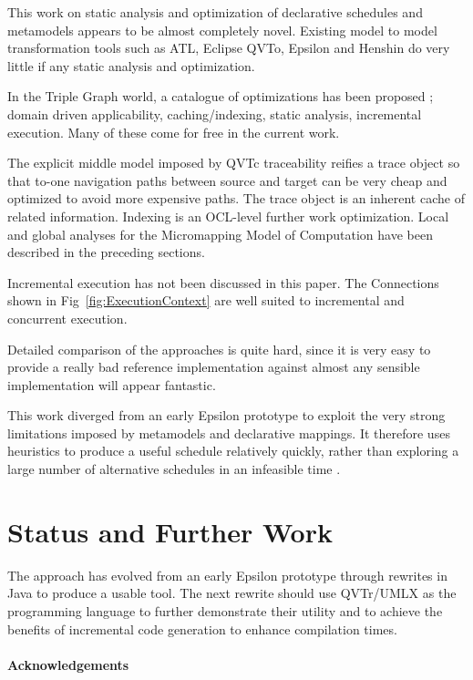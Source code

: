 \documentclass{llncs}
\begin{document}
This work on static analysis and optimization of declarative schedules and metamodels appears to be almost completely novel. Existing model to model transformation tools such as ATL, Eclipse QVTo, Epsilon and Henshin \cite{Eclipse-Henshin} do very little if any static analysis and optimization.

In the Triple Graph world, a catalogue of optimizations has been proposed \cite{TGG-Optimization}; domain driven applicability, caching/indexing, static analysis, incremental execution. Many of these come for free in the current work.

The explicit middle model imposed by QVTc traceability reifies a trace object so that to-one navigation paths between source and target can be very cheap and optimized to avoid more expensive paths.
The trace object is an inherent cache of related information. Indexing is an OCL-level further work optimization. Local and global analyses for the Micromapping Model of Computation have been described in the preceding sections.

Incremental execution has not been discussed in this paper. The Connections shown in Fig~\ref{fig:ExecutionContext} are well suited to incremental and concurrent execution.

Detailed comparison of the approaches is quite hard, since it is very easy to provide a really bad reference implementation against almost any sensible implementation will appear fantastic.

This work diverged from an early Epsilon prototype to exploit the very strong limitations imposed by metamodels and declarative mappings. It therefore uses heuristics to produce a useful schedule relatively quickly, rather than exploring a large number of alternative schedules in an infeasible time \cite{Horacio-planning}.

\section{Status and Further Work}\label{Status}

The approach has evolved from an early Epsilon prototype through rewrites in Java to produce a usable tool. The next rewrite should use QVTr/UMLX as the programming language to further demonstrate their utility and to achieve the benefits of incremental code generation to enhance compilation times.

\paragraph{Acknowledgements}
\end{document}
